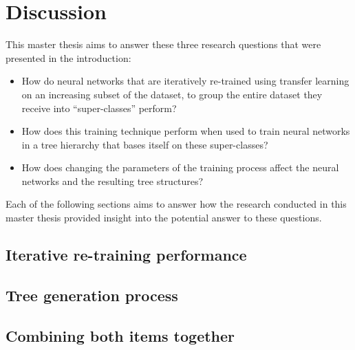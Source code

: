 \chapter{Discussion}


This master thesis aims to answer these three research questions that were presented in the introduction:

\begin{itemize}
    \item How do neural networks that are iteratively re-trained using transfer learning on an increasing subset of the dataset, to group the entire dataset they receive into “super-classes” perform? 
    \item How does this training technique perform when used to train neural networks in a tree hierarchy that bases itself on these super-classes?
    \item How does changing the parameters of the training process affect the neural networks and the resulting tree structures?
\end{itemize}{}

Each of the following sections aims to answer how the research conducted in this master thesis provided insight into the potential answer to these questions.


\section{Iterative re-training performance}


\section{Tree generation process}

\section{Combining both items together}



